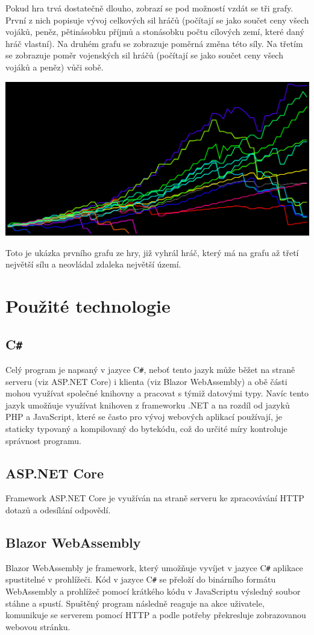 \documentclass[a4paper,12pt]{article}
\def\CS{C\texttt{\#}}
\begin{document}
Pokud hra trvá dostatečně dlouho, zobrazí se pod možností vzdát se tři grafy. První z nich popisuje vývoj celkových sil hráčů (počítají se jako součet ceny všech vojáků, peněz, pětinásobku příjmů a stonásobku počtu cílových zemí, které daný hráč vlastní). Na druhém grafu se zobrazuje poměrná změna této síly. Na třetím se zobrazuje poměr vojenských sil hráčů (počítají se jako součet ceny všech vojáků a peněz) vůči sobě.

\includegraphics[width=\textwidth]{PowersGraph.png}

Toto je ukázka prvního grafu ze hry, již vyhrál hráč, který má na grafu až třetí největší sílu a neovládal zdaleka největší území.

\section{Použité technologie}
\subsection{\CS{}}
Celý program je napsaný v jazyce \CS{}, neboť tento jazyk může běžet na straně serveru (viz ASP.NET Core) i klienta (viz Blazor WebAssembly) a obě části mohou využívat společné knihovny a pracovat s týmiž datovými typy. Navíc tento jazyk umožňuje využívat knihoven z frameworku .NET a na rozdíl od jazyků PHP a JavaScript, které se často pro vývoj webových aplikací používají, je staticky typovaný a kompilovaný do bytekódu, což do určité míry kontroluje správnost programu.
\subsection{ASP.NET Core}
Framework ASP.NET Core je využíván na straně serveru ke zpracovávání HTTP dotazů a odesílání odpovědí.
\subsection{Blazor WebAssembly}
Blazor WebAssembly je framework, který umožňuje vyvíjet v jazyce  \CS{} aplikace spustitelné v prohlížeči. Kód v jazyce  \CS{} se přeloží do binárního formátu WebAssembly a prohlížeč pomocí krátkého kódu v JavaScriptu výsledný soubor stáhne a spustí. Spuštěný program následně reaguje na akce uživatele, komunikuje se serverem pomocí HTTP a podle potřeby překresluje zobrazovanou webovou stránku.
\end{document}
